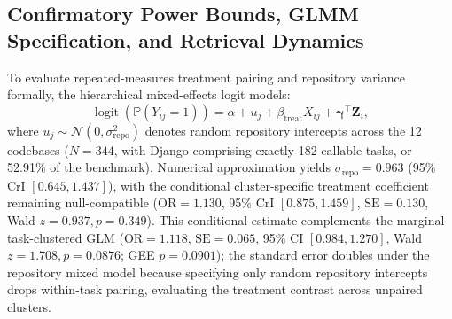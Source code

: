 \documentclass[10pt]{article}
\begin{document}
\subsection{Confirmatory Power Bounds, GLMM Specification, and Retrieval Dynamics}
\label{app:glmm_spec}
To evaluate repeated-measures treatment pairing and repository variance formally, the hierarchical mixed-effects logit models:
\begin{equation}
\operatorname{logit}(\mathbb{P}(Y_{ij}=1)) = \alpha + u_j + \beta_{\text{treat}} X_{ij} + \boldsymbol{\gamma}^\top \mathbf{Z}_i,
\end{equation}
where $u_j \sim \mathcal{N}(0, \sigma_{\text{repo}}^2)$ denotes random repository intercepts across the 12 codebases ($N=344$, with Django comprising exactly 182 callable tasks, or 52.91\% of the benchmark). Numerical approximation yields $\sigma_{\text{repo}} = 0.963$ (95\% CrI $[0.645, 1.437]$), with the conditional cluster-specific treatment coefficient remaining null-compatible ($\text{OR} = 1.130$, 95\% CrI $[0.875, 1.459]$, $\text{SE} = 0.130$, Wald $z = 0.937, p = 0.349$). This conditional estimate complements the marginal task-clustered GLM ($\text{OR} = 1.118$, $\text{SE} = 0.065$, 95\% CI $[0.984, 1.270]$, Wald $z = 1.708, p = 0.0876$; GEE $p = 0.0901$); the standard error doubles under the repository mixed model because specifying only random repository intercepts drops within-task pairing, evaluating the treatment contrast across unpaired clusters.
\end{document}
